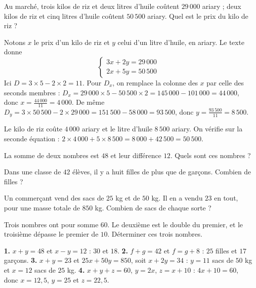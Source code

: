 \begin{exemple}
Au marché, trois kilos de riz et deux litres d'huile coûtent
$29\,000$ ariary ; deux kilos de riz et cinq litres d'huile coûtent
$50\,500$ ariary. Quel est le prix du kilo de riz ?

Notons $x$ le prix d'un kilo de riz et $y$ celui d'un litre d'huile, en
ariary. Le texte donne
\[
  \begin{cases} 3x+2y = 29\,000\\ 2x+5y = 50\,500 \end{cases}
\]
Ici $D = 3\times5-2\times2 = 11$. Pour $D_{x}$, on remplace la colonne des
$x$ par celle des seconds membres :
$D_{x} = 29\,000\times5-50\,500\times2 = 145\,000-101\,000 = 44\,000$, donc
$x = \frac{44\,000}{11} = 4\,000$. De même
$D_{y} = 3\times50\,500-2\times29\,000 = 151\,500-58\,000 = 93\,500$, donc
$y = \frac{93\,500}{11} = 8\,500$.

Le kilo de riz coûte $4\,000$ ariary et le litre d'huile $8\,500$ ariary. On
vérifie sur la seconde équation :
$2\times4\,000+5\times8\,500 = 8\,000+42\,500 = 50\,500$. \checkmark
\end{exemple}

\begin{entrainement}
\exo[\niveau{1}] La somme de deux nombres est $48$ et leur différence $12$.
Quels sont ces nombres ?

\exo[\niveau{2}] Dans une classe de $42$ élèves, il y a huit filles de plus
que de garçons. Combien de filles ?

\exo[\niveau{2}] Un commerçant vend des sacs de $25$ kg et de $50$ kg. Il en
a vendu $23$ en tout, pour une masse totale de $850$ kg. Combien de sacs de
chaque sorte ?

\exo[\niveau{3}] Trois nombres ont pour somme $60$. Le deuxième est le double
du premier, et le troisième dépasse le premier de $10$. Déterminer ces trois
nombres.
\end{entrainement}

\begin{corrige}
\textbf{1.} $x+y = 48$ et $x-y = 12$ : $30$ et $18$.
\textbf{2.} $f+g = 42$ et $f = g+8$ : $25$ filles et $17$ garçons.
\textbf{3.} $x+y = 23$ et $25x+50y = 850$, soit $x+2y = 34$ : $y = 11$ sacs
de $50$ kg et $x = 12$ sacs de $25$ kg.
\textbf{4.} $x+y+z = 60$, $y = 2x$, $z = x+10$ : $4x+10 = 60$, donc $x = 12{,}5$,
$y = 25$ et $z = 22{,}5$.
\end{corrige}

